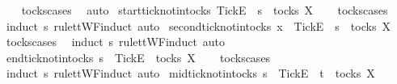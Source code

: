 %
\isadelimproof
\ \ %
\endisadelimproof
%
\isatagproof
{}\isamarkupfalse%
\ tocks{\isachardot}cases\ \isamarkupfalse%
\ {\isacharparenleft}auto{\isacharparenright}%
\endisatagproof
{\isafoldproof}%
%
\isadelimproof
\isanewline
%
\endisadelimproof
\isanewline
{}\isamarkupfalse%
\ start{\isacharunderscore}tick{\isacharunderscore}notin{\isacharunderscore}tocks{\isacharcolon}\ {\isachardoublequoteopen}{\isacharbrackleft}Tick{\isacharbrackright}\isactrlsub E\ {\isacharhash}\ s\ {\isasymnotin}\ tocks\ X{\isachardoublequoteclose}\isanewline
%
\isadelimproof
\ \ %
\endisadelimproof
%
\isatagproof
{}\isamarkupfalse%
\ tocks{\isachardot}cases\ \isamarkupfalse%
\ {\isacharparenleft}induct\ s\ rule{\isacharcolon}ttWF{\isachardot}induct{\isacharcomma}\ auto{\isacharparenright}%
\endisatagproof
{\isafoldproof}%
%
\isadelimproof
\isanewline
%
\endisadelimproof
\isanewline
{}\isamarkupfalse%
\ second{\isacharunderscore}tick{\isacharunderscore}notin{\isacharunderscore}tocks{\isacharcolon}\ {\isachardoublequoteopen}x\ {\isacharhash}\ {\isacharbrackleft}Tick{\isacharbrackright}\isactrlsub E\ {\isacharhash}\ s\ {\isasymnotin}\ tocks\ X{\isachardoublequoteclose}\isanewline
%
\isadelimproof
\ \ %
\endisadelimproof
%
\isatagproof
{}\isamarkupfalse%
\ tocks{\isachardot}cases\ \isamarkupfalse%
\ {\isacharparenleft}induct\ s\ rule{\isacharcolon}ttWF{\isachardot}induct{\isacharcomma}\ auto{\isacharparenright}%
\endisatagproof
{\isafoldproof}%
%
\isadelimproof
\isanewline
%
\endisadelimproof
\isanewline
{}\isamarkupfalse%
\ end{\isacharunderscore}tick{\isacharunderscore}notin{\isacharunderscore}tocks{\isacharcolon}\ {\isachardoublequoteopen}s\ {\isacharat}\ {\isacharbrackleft}{\isacharbrackleft}Tick{\isacharbrackright}\isactrlsub E{\isacharbrackright}\ {\isasymnotin}\ tocks\ X{\isachardoublequoteclose}\isanewline
%
\isadelimproof
\ \ %
\endisadelimproof
%
\isatagproof
{}\isamarkupfalse%
\ tocks{\isachardot}cases\ \isamarkupfalse%
\ {\isacharparenleft}induct\ s\ rule{\isacharcolon}ttWF{\isachardot}induct{\isacharcomma}\ auto{\isacharparenright}%
\endisatagproof
{\isafoldproof}%
%
\isadelimproof
\isanewline
%
\endisadelimproof
\isanewline
{}\isamarkupfalse%
\ mid{\isacharunderscore}tick{\isacharunderscore}notin{\isacharunderscore}tocks{\isacharcolon}\ {\isachardoublequoteopen}s\ {\isacharat}\ {\isacharbrackleft}{\isacharbrackleft}Tick{\isacharbrackright}\isactrlsub E{\isacharbrackright}\ {\isacharat}\ t\ {\isasymnotin}\ tocks\ X{\isachardoublequoteclose}\isanewline
